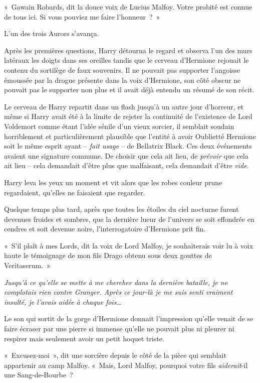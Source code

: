 «~Gawain Robards, dit la douce voix de Lucius Malfoy. Votre probité est connue de tous ici. Si vous pouviez me faire l'honneur~?~»

L'un des trois Aurors s'avança.

Après les premières questions, Harry détourna le regard et observa l'un des murs latéraux les doigts dans ses oreilles tandis que le cerveau d'Hermione rejouait le contenu du sortilège de faux souvenirs. Il ne pouvait pas supporter l'angoisse émoussée par la drogue présente dans la voix d'Hermione, son côté obscur ne pouvait pas le supporter non plus et il avait déjà entendu un résumé de son récit.

Le cerveau de Harry repartit dans un flash jusqu'à un autre jour d'horreur, et même si Harry avait été à la limite de rejeter la continuité de l'existence de Lord Voldemort comme étant l'idée sénile d'un vieux sorcier, il semblait soudain horriblement et particulièrement plausible que l'entité à avoir Oublietté Hermione soit le même esprit ayant -- \emph{fait usage} -- de Bellatrix Black. Ces deux événements avaient une signature commune. De choisir que cela ait lieu, de \emph{prévoir} que cela ait lieu -- cela demandait d'être plus que malfaisant, cela demandait d'être \emph{vide}.

Harry leva les yeux un moment et vit alors que les robes couleur prune regardaient, qu'elles ne faisaient que regarder.

Quelque temps plus tard, après que toutes les étoiles du ciel nocturne furent devenues froides et sombres, que la dernière lueur de l'univers se soit effondrée en cendres et soit devenue noire, l'interrogatoire d'Hermione prit fin.

«~S'il plaît à mes Lords, dit la voix de Lord Malfoy, je souhaiterais voir lu à voix haute le témoignage de mon fils Drago obtenu sous deux gouttes de Veritaserum.~»

\emph{Jusqu'à ce qu'elle se mette à me chercher dans la dernière bataille, je ne complotais rien contre Granger. Après ce jour-là je me suis senti vraiment insulté, je l'avais aidée à chaque fois…}

Le son qui sortit de la gorge d'Hermione donnait l'impression qu'elle venait de se faire écraser par une pierre si immense qu'elle ne pouvait plus ni pleurer ni respirer mais seulement avoir un petit hoquet triste.

«~Excusez-moi~», dit une sorcière depuis le côté de la pièce qui semblait appartenir au camp Malfoy. «~Mais, Lord Malfoy, pourquoi votre fils \emph{aiderait}-il une Sang-de-Bourbe~?

